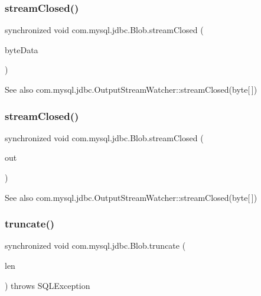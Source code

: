 \subsubsection{\texorpdfstring{stream\+Closed()}{streamClosed()}\hspace{0.1cm}{\footnotesize\ttfamily [1/2]}}
{\footnotesize\ttfamily synchronized void com.\+mysql.\+jdbc.\+Blob.\+stream\+Closed (\begin{DoxyParamCaption}\item[{byte \mbox{[}$\,$\mbox{]}}]{byte\+Data }\end{DoxyParamCaption})}

\begin{DoxySeeAlso}{See also}
com.\+mysql.\+jdbc.\+Output\+Stream\+Watcher\+::stream\+Closed(byte\mbox{[}$\,$\mbox{]}) 
\end{DoxySeeAlso}
\mbox{\label{classcom_1_1mysql_1_1jdbc_1_1_blob_a91be83b3b4b6ebf95318f681051065ed}} 
\subsubsection{\texorpdfstring{stream\+Closed()}{streamClosed()}\hspace{0.1cm}{\footnotesize\ttfamily [2/2]}}
{\footnotesize\ttfamily synchronized void com.\+mysql.\+jdbc.\+Blob.\+stream\+Closed (\begin{DoxyParamCaption}\item[{Watchable\+Output\+Stream}]{out }\end{DoxyParamCaption})}

\begin{DoxySeeAlso}{See also}
com.\+mysql.\+jdbc.\+Output\+Stream\+Watcher\+::stream\+Closed(byte\mbox{[}$\,$\mbox{]}) 
\end{DoxySeeAlso}
\mbox{\label{classcom_1_1mysql_1_1jdbc_1_1_blob_ac1341e0ed7c4ba983773aee70c265cb9}} 
\subsubsection{\texorpdfstring{truncate()}{truncate()}}
{\footnotesize\ttfamily synchronized void com.\+mysql.\+jdbc.\+Blob.\+truncate (\begin{DoxyParamCaption}\item[{long}]{len }\end{DoxyParamCaption}) throws S\+Q\+L\+Exception}

